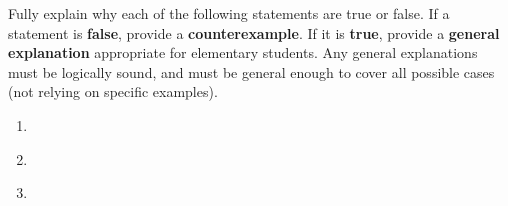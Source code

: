 
Fully explain why each of the following statements are true or false. If a statement is \textbf{\textcolor{BrickRed}{false}}, provide a \textbf{\textcolor{BrickRed}{counterexample}}. If it is \textbf{\textcolor{OliveGreen}{true}}, provide a \textbf{\textcolor{OliveGreen}{general explanation}} appropriate for elementary students. Any general explanations must be logically sound, and must be general enough to cover all possible cases (not relying on specific examples).

\begin{enumerate}

    \item {}

    \vfill
    \begin{ansenv}
    \end{ansenv}
    \vfill

    \item {}

    \vfill
    \begin{ansenv}
    \end{ansenv}
    \vfill

    \item {}

    \vfill
    \begin{ansenv}
    \end{ansenv}
    \vfill
\end{enumerate}